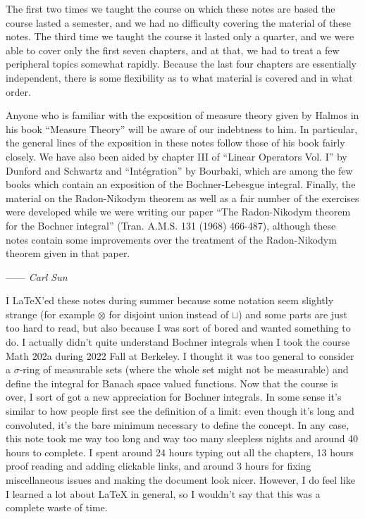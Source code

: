 The first two times we taught the course on which these notes are based the course lasted a semester, and we had no difficulty covering the material of these notes. The third time we taught the course it lasted only a quarter, and we were able to cover only the first seven chapters, and at that, we had to treat a few peripheral topics somewhat rapidly. Because the last four chapters are essentially independent, there is some flexibility as to what material is covered and in what order.

Anyone who is familiar with the exposition of measure theory given by Halmos in his book ``Measure Theory'' will be aware of our indebtness to him. In particular, the general lines of the exposition in these notes follow those of his book fairly closely. We have also been aided by chapter III of ``Linear Operators Vol. I'' by Dunford and Schwartz and ``Int\'{e}gration'' by Bourbaki, which are among the few books which contain an exposition of the Bochner-Lebesgue integral. Finally, the material on the Radon-Nikodym theorem as well as a fair number of the exercises were developed while we were writing our paper ``The Radon-Nikodym theorem for the Bochner integral'' (Tran. A.M.S. 131 (1968) 466-487), although these notes contain some improvements over the treatment of the Radon-Nikodym theorem given in that paper.



\hspace*{0pt}\hfill------ {\it Carl Sun}


I LaTeX'ed these notes during summer because some notation seem slightly strange (for example $\otimes$ for disjoint union instead of $\sqcup$) and some parts are just too hard to read, but also because I was sort of bored and wanted something to do. I actually didn't quite understand Bochner integrals when I took the course Math 202a during 2022 Fall at Berkeley. I thought it was too general to consider a $\sigma$-ring of measurable sets (where the whole set might not be measurable) and define the integral for Banach space valued functions. Now that the course is over, I sort of got a new appreciation for Bochner integrals. In some sense it's similar to how people first see the definition of a limit: even though it's long and convoluted, it's the bare minimum necessary to define the concept. In any case, this note took me way too long and way too many sleepless nights and around 40 hours to complete. I spent around 24 hours typing out all the chapters, 13 hours proof reading and adding clickable links, and around 3 hours for fixing miscellaneous issues and making the document look nicer. However, I do feel like I learned a lot about LaTeX in general, so I wouldn't say that this was a complete waste of time. 